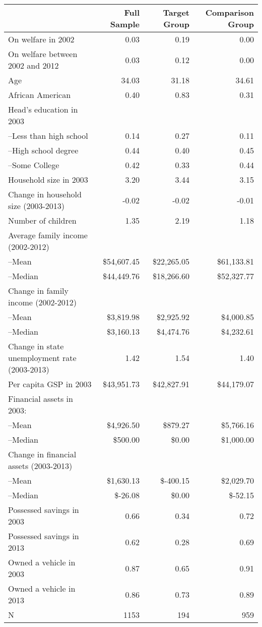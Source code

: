 \begin{tabular}{lrrr}
  \toprule
  & Full Sample & Target Group & Comparison Group \\ 
  \midrule
On welfare in 2002 & 0.03 & 0.19 & 0.00 \\ 
  On welfare between 2002 and 2012 & 0.03 & 0.12 & 0.00 \\ 
  Age & 34.03 & 31.18 & 34.61 \\ 
  African American & 0.40 & 0.83 & 0.31 \\ 
  Head's education in 2003 &  &  &  \\ 
  --Less than high school & 0.14 & 0.27 & 0.11 \\ 
  --High school degree & 0.44 & 0.40 & 0.45 \\ 
  --Some College & 0.42 & 0.33 & 0.44 \\ 
  Household size in 2003 & 3.20 & 3.44 & 3.15 \\ 
  Change in household size (2003-2013) & -0.02 & -0.02 & -0.01 \\ 
  Number of children & 1.35 & 2.19 & 1.18 \\ 
  Average family income (2002-2012) &  &  &  \\ 
  --Mean & \$54,607.45 & \$22,265.05 & \$61,133.81 \\ 
  --Median & \$44,449.76 & \$18,266.60 & \$52,327.77 \\ 
  Change in family income (2002-2012) &  &  &  \\ 
  --Mean & \$3,819.98 & \$2,925.92 & \$4,000.85 \\ 
  --Median & \$3,160.13 & \$4,474.76 & \$4,232.61 \\ 
  Change in state unemployment rate (2003-2013) & 1.42 & 1.54 & 1.40 \\ 
  Per capita GSP in 2003 & \$43,951.73 & \$42,827.91 & \$44,179.07 \\ 
  Financial assets in 2003: &  &  &  \\ 
  --Mean & \$4,926.50 & \$879.27 & \$5,766.16 \\ 
  --Median & \$500.00 & \$0.00 & \$1,000.00 \\ 
  Change in financial assets (2003-2013) &  &  &  \\ 
  --Mean & \$1,630.13 & \$-400.15 & \$2,029.70 \\ 
  --Median & \$-26.08 & \$0.00 & \$-52.15 \\ 
  Possessed savings in 2003 & 0.66 & 0.34 & 0.72 \\ 
  Possessed savings in 2013 & 0.62 & 0.28 & 0.69 \\ 
  Owned a vehicle in 2003 & 0.87 & 0.65 & 0.91 \\ 
  Owned a vehicle in 2013 & 0.86 & 0.73 & 0.89 \\ 
  N & 1153 & 194 & 959 \\ 
   \bottomrule
\end{tabular}
